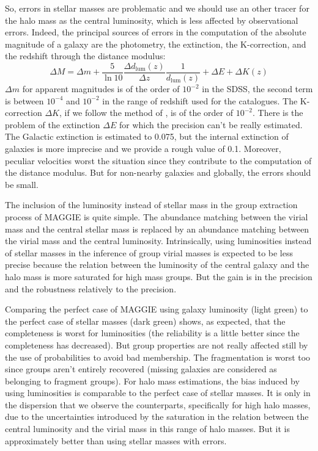 So, errors in stellar masses are problematic and we should use an other tracer
for the halo mass as the central luminosity, which is less affected by
observational errors. Indeed, the principal sources of errors in the
computation of the absolute magnitude of a galaxy are the photometry, the
extinction, the K-correction, and the redshift through the distance modulus:
%
\begin{equation} \Delta M=\Delta m + \frac{5}{\ln{10}} \frac{\Delta
d_\mathrm{lum} \left(z\right)}{\Delta z} \frac{1}{d_\mathrm{lum}
\left(z\right)} + \Delta E + \Delta K\left(z\right) \end{equation}
%
$\Delta m$ for apparent magnitudes is of the order of $10^{-2}$ in the SDSS,
the second term is between $10^{-4}$ and $10^{-2}$ in the range of redshift
used for the catalogues. The K-correction $\Delta K$, if we follow the method
of \citet{Chilingarian+10}, is of the order of $10^{-2}$. There is the problem
of the extinction $\Delta E$ for which the precision can't be really estimated.
The Galactic extinction is estimated to 0.075, but the internal extinction of
galaxies is more imprecise and we provide a rough value of 0.1. Moreover,
peculiar velocities worst the situation since they contribute to the
computation of the distance modulus. But for non-nearby galaxies and globally,
the errors should be small.

The inclusion of the luminosity instead of stellar mass in the group extraction
process of MAGGIE is quite simple. The abundance matching between the virial
mass and the central stellar mass is replaced by an abundance matching between
the virial mass and the central luminosity. Intrinsically, using luminosities
instead of stellar masses in the inference of group virial masses is expected
to be less precise because the relation between the luminosity of the central
galaxy and the halo mass is more saturated for high mass groups. But the gain
is in the precision and the robustness relatively to the precision.

Comparing the perfect case of MAGGIE using galaxy luminosity (light green) to
the perfect case of stellar masses (dark green) shows, as expected, that the
completeness is worst for luminosities (the reliability is a little better
since the completeness has decreased). But group properties are not really
affected still by the use of probabilities to avoid bad membership. The
fragmentation is worst too since groups aren't entirely recovered (missing
galaxies are considered as belonging to fragment groups). For halo mass
estimations, the bias induced by using luminosities is comparable to the
perfect case of stellar masses. It is only in the dispersion that we observe
the counterparts, specifically for high halo masses, due to the uncertainties
introduced by the saturation in the relation between the central luminosity and
the virial mass in this range of halo masses. But it is approximately better
than using stellar masses with errors.

